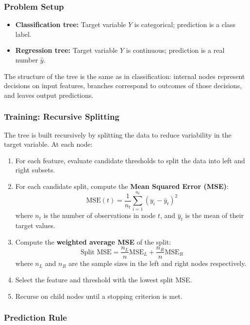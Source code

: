 \documentclass[9pt]{extarticle}
\begin{document}
\subsubsection*{Problem Setup}

\begin{itemize}
    \item \textbf{Classification tree:} Target variable $Y$ is categorical; prediction is a class label.
    \item \textbf{Regression tree:} Target variable $Y$ is continuous; prediction is a real number $\hat{y}$.
\end{itemize}
The structure of the tree is the same as in classification: internal nodes represent decisions on input features, branches correspond to outcomes of those decisions, and leaves output predictions.

\subsubsection*{Training: Recursive Splitting}

The tree is built recursively by splitting the data to reduce variability in the target variable. At each node:

\begin{enumerate}
    \item For each feature, evaluate candidate thresholds to split the data into left and right subsets.
    \item For each candidate split, compute the \textbf{Mean Squared Error (MSE)}:
    \[
    \text{MSE}(t) = \frac{1}{n_t} \sum_{i=1}^{n_t} (y_i - \bar{y}_t)^2
    \]
    where $n_t$ is the number of observations in node $t$, and $\bar{y}_t$ is the mean of their target values.

    \item Compute the \textbf{weighted average MSE} of the split:
    \[
    \text{Split MSE} = \frac{n_L}{n} \text{MSE}_L + \frac{n_R}{n} \text{MSE}_R
    \]
    where $n_L$ and $n_R$ are the sample sizes in the left and right nodes respectively.

    \item Select the feature and threshold with the lowest split MSE.
    \item Recurse on child nodes until a stopping criterion is met.
\end{enumerate}

\subsubsection*{Prediction Rule}
\end{document}
